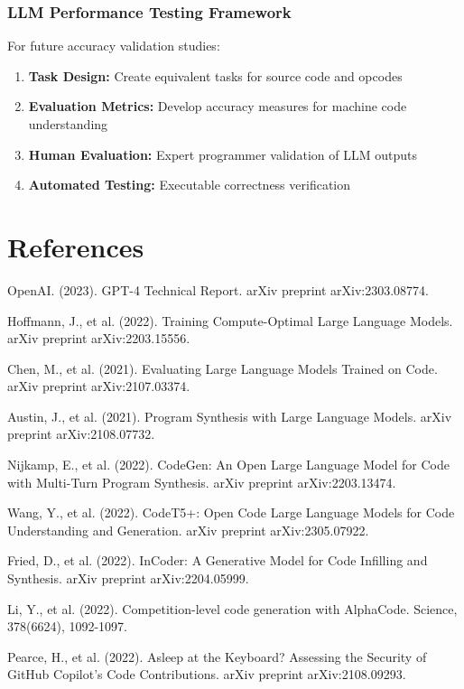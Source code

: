 \documentclass[11pt,a4paper]{article}
\begin{document}
\subsubsection{LLM Performance Testing Framework}
For future accuracy validation studies:

\begin{enumerate}
    \item \textbf{Task Design:} Create equivalent tasks for source code and opcodes
    \item \textbf{Evaluation Metrics:} Develop accuracy measures for machine code understanding
    \item \textbf{Human Evaluation:} Expert programmer validation of LLM outputs
    \item \textbf{Automated Testing:} Executable correctness verification
\end{enumerate}

\section{References}

\begin{thebibliography}{9}

OpenAI. (2023). GPT-4 Technical Report. arXiv preprint arXiv:2303.08774.

Hoffmann, J., et al. (2022). Training Compute-Optimal Large Language Models. arXiv preprint arXiv:2203.15556.

Chen, M., et al. (2021). Evaluating Large Language Models Trained on Code. arXiv preprint arXiv:2107.03374.

Austin, J., et al. (2021). Program Synthesis with Large Language Models. arXiv preprint arXiv:2108.07732.

Nijkamp, E., et al. (2022). CodeGen: An Open Large Language Model for Code with Multi-Turn Program Synthesis. arXiv preprint arXiv:2203.13474.

Wang, Y., et al. (2022). CodeT5+: Open Code Large Language Models for Code Understanding and Generation. arXiv preprint arXiv:2305.07922.

Fried, D., et al. (2022). InCoder: A Generative Model for Code Infilling and Synthesis. arXiv preprint arXiv:2204.05999.

Li, Y., et al. (2022). Competition-level code generation with AlphaCode. Science, 378(6624), 1092-1097.

Pearce, H., et al. (2022). Asleep at the Keyboard? Assessing the Security of GitHub Copilot's Code Contributions. arXiv preprint arXiv:2108.09293.

\end{thebibliography}
\end{document}
